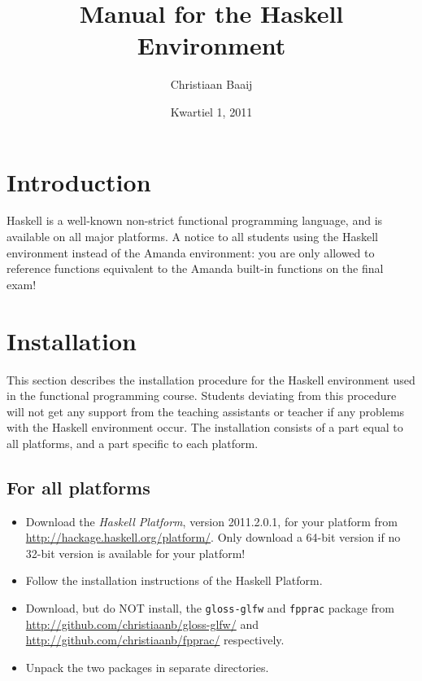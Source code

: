 \documentclass[]{article}
\title{Manual for the Haskell Environment}
\author{Christiaan Baaij}
\date{Kwartiel 1, 2011}
\begin{document}

\maketitle

\section{Introduction}
Haskell is a well-known non-strict functional programming language, and is available on all major platforms. A notice to all students using the Haskell environment instead of the Amanda environment: you are only allowed to reference functions equivalent to the Amanda built-in functions on the final exam!

\section{Installation}
This section describes the installation procedure for the Haskell environment used in the functional programming course. Students deviating from this procedure will not get any support from the teaching assistants or teacher if any problems with the Haskell environment occur. The installation consists of a part equal to all platforms, and a part specific to each platform.

\subsection{For all platforms}
\begin{itemize}
  \item Download the \emph{Haskell Platform}, version 2011.2.0.1, for your platform from \url{http://hackage.haskell.org/platform/}. Only download a 64-bit version if no 32-bit version is available for your platform! 
  \item Follow the installation instructions of the Haskell Platform.
  \item Download, but do NOT install, the \verb!gloss-glfw! and \verb!fpprac! package from \url{http://github.com/christiaanb/gloss-glfw/} and \url{http://github.com/christiaanb/fpprac/} respectively.
  \item Unpack the two packages in separate directories.
\end{itemize}
\end{document}
